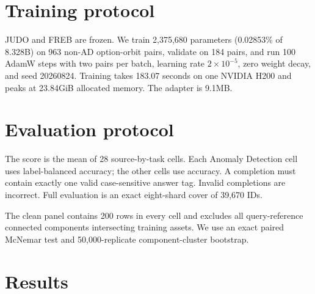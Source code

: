 \documentclass[10pt]{article}
\begin{document}
\section{Training protocol}
JUDO and FREB are frozen. We train 2,375,680 parameters (0.02853\% of 8.328B)
on 963 non-AD option-orbit pairs, validate on 184 pairs, and run 100 AdamW steps
with two pairs per batch, learning rate $2\times10^{-5}$, zero weight decay,
and seed 20260824. Training takes 183.07 seconds on one NVIDIA H200 and peaks at
23.84GiB allocated memory. The adapter is 9.1MB.

\section{Evaluation protocol}
The score is the mean of 28 source-by-task cells. Each Anomaly Detection cell
uses label-balanced accuracy; the other cells use accuracy. A completion must
contain exactly one valid case-sensitive answer tag. Invalid completions are
incorrect. Full evaluation is an exact eight-shard cover of 39,670 IDs.

The clean panel contains 200 rows in every cell and excludes all
query-reference connected components intersecting training assets. We use an
exact paired McNemar test and 50,000-replicate component-cluster bootstrap.

\section{Results}
\begin{table}[t]
\centering
\caption{MMAD standard 1-shot comparison. JUDO and AD-Copilot values are
paper-reported; ECHO is the strict 39,670-row census in this archive.}
\label{tab:full}
\end{table}
\end{document}
